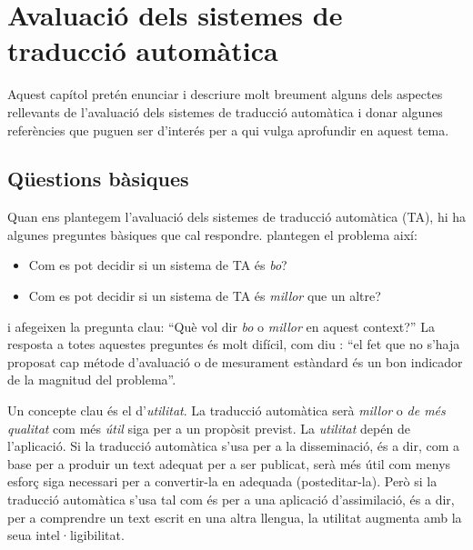 \chapter{Avaluació dels sistemes de traducció automàtica}
\label{se:ASTA}

Aquest capítol pretén enunciar i descriure molt breument alguns dels
aspectes rellevants de l'avaluació dels sistemes de traducció
automàtica i donar algunes referències que puguen ser d'interés per a
qui vulga aprofundir en aquest tema.

\section{Qüestions bàsiques} 
Quan ens plantegem l'avaluació dels sistemes de traducció automàtica
(TA), hi ha algunes preguntes bàsiques que cal
respondre. \citet{arnold94b} plantegen el problema així:
\begin{itemize}
\item Com es pot decidir si un sistema de TA és \emph{bo}?
\item Com es pot decidir si un sistema de TA és \emph{millor} que un
  altre?
\end{itemize}
i afegeixen la pregunta clau: ``Què vol dir \emph{bo} o \emph{millor}
en aquest context?'' La resposta a totes aquestes preguntes és molt
difícil, com diu \citet{minnis94j}: ``el fet que no s'haja proposat
cap métode d'avaluació o de mesurament estàndard és un bon indicador
de la magnitud del problema''.

Un concepte clau és el d'\emph{utilitat}. La traducció automàtica serà
\emph{millor} o \emph{de més qualitat} com més \emph{útil} siga per a
un propòsit previst. La \emph{utilitat} depén de l'aplicació. Si la
traducció automàtica s'usa per a la disseminació, és a dir, com a base
per a produir un text adequat per a ser publicat, serà més útil com
menys esforç siga necessari per a convertir-la en adequada
(posteditar-la). Però si la traducció automàtica s'usa tal com és per
a una aplicació d'assimilació, és a dir, per a comprendre un text
escrit en una altra llengua, la utilitat augmenta amb la seua
intel·ligibilitat.

